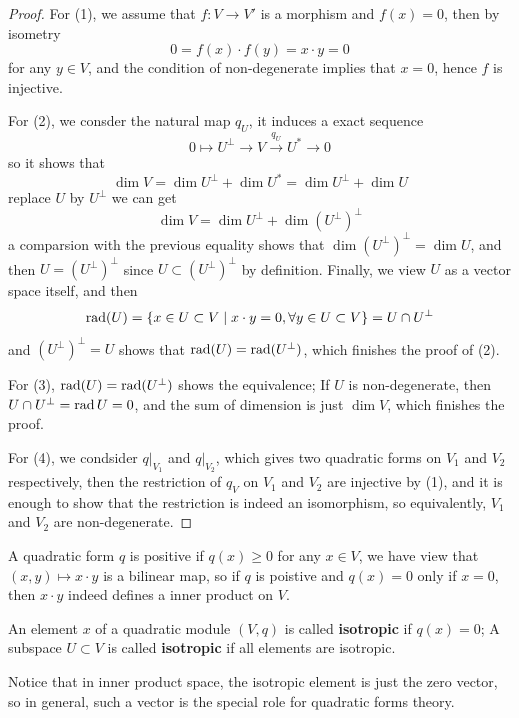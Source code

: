 \begin{proof}
    For (1), we assume that \(f: V \to V'\) is a morphism and \(f(x) = 0\), then by isometry
    \[0= f(x) \cdot f(y) = x \cdot y = 0\]
    for any \(y \in V\), and the condition of non-degenerate implies that \(x = 0\), hence \(f\) is injective.

    For (2), we consder the natural map \(q_U\), it induces a exact sequence
    \[0 \mapsto U^\perp \to V \xrightarrow{q_U}  U^* \to 0 \]
    so it shows that
    \[\dim  V = \dim U^\perp + \dim U^* = \dim U^\perp + \dim U \]
    replace \(U\) by \(U^\perp\) we can get
    \[\dim V = \dim U^\perp + \dim (U^\perp)^\perp\]
    a comparsion with the previous equality shows that \(\dim (U^\perp)^\perp = \dim U\), and then \(U  = (U^\perp)^\perp\) since \(U \subset (U^\perp)^\perp\) by definition. Finally, we view \(U\) as a vector space itself, and then
    \[\operatorname{rad}(U) = \{x \in U \subset V \mid x \cdot y = 0, \forall y \in U \subset V\} = U \cap U^\perp\]
    and \((U^\perp)^\perp = U\) shows that \(\operatorname{rad}(U) = \operatorname{rad}(U^\perp)\), which finishes the proof of (2).

    For (3), \(\operatorname{rad}(U) = \operatorname{rad}(U^\perp)\) shows the equivalence; If \(U\) is non-degenerate, then \( U \cap U^\perp = \operatorname{rad} U = 0\), and the sum of dimension is just \(\dim V\), which finishes the proof.

    For (4), we condsider \(q|_{V_1}\) and \(q|_{V_2}\), which gives two quadratic forms on \(V_1\) and \(V_2\) respectively, then the restriction of \(q_V\) on \(V_1\) and \(V_2\) are injective by (1), and it is enough to show that the restriction is indeed an isomorphism, so equivalently, \(V_1\) and \(V_2\) are non-degenerate.
\end{proof}

\begin{remark}
    A quadratic form \(q\) is positive if \(q(x) \geq 0\) for any \(x \in V\), we have view that \((x,y) \mapsto x \cdot y\) is a bilinear map, so if \(q\) is poistive and \(q(x) = 0\) only if \(x =0 \), then \(x \cdot y\) indeed defines a inner product on \(V\).
\end{remark}

\begin{definition}
    An element \(x\) of a quadratic module \((V,q)\) is called \textbf{isotropic} if \(q(x) = 0\); A subspace \(U \subset V\) is called \textbf{isotropic} if all elements are isotropic.
\end{definition}

Notice that in inner product space, the isotropic element is just the zero vector, so in general, such a vector is the special role for quadratic forms theory.

